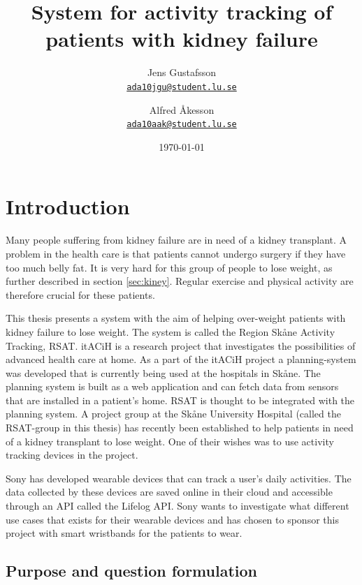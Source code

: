 \documentclass{cslthse-msc}
\author{
	Jens Gustafsson \\
	{\normalsize \href{mailto:ada10jgu@student.lu.se}{\texttt{ada10jgu@student.lu.se}}}
	\and
	Alfred Åkesson \\
    {\normalsize \href{mailto:ada10aak@student.lu.se}{\texttt{ada10aak@student.lu.se}}}
}
\title{System for activity tracking of patients with kidney failure}
\date{\today}
\begin{document}
\makefrontmatter


\chapter[Introduction]{Introduction}

Many people suffering from kidney failure are in need of a kidney transplant. A problem in the health care is that patients cannot undergo surgery if they have too much belly fat. It is very hard for this group of people to lose weight, as further described in section \ref{sec:kiney}. Regular exercise and physical activity are therefore crucial for these patients. 

This thesis presents a system with the aim of helping over-weight patients with kidney failure to lose weight. The system is called the Region Skåne Activity Tracking, RSAT. 
itACiH is a research project that investigates the possibilities of advanced health care at home. As a part of the itACiH project a planning-system was developed that is currently being used at the hospitals in Skåne. The planning system is built as a web application and can fetch data from sensors that are installed in a patient's home. RSAT is thought to be integrated with the planning system. 
A project group at the Skåne University Hospital (called the RSAT-group in this thesis) has recently been established to help patients in need of a kidney transplant to lose weight. One of their wishes was to use activity tracking devices in the project. 

Sony has developed wearable devices that can track a user’s daily activities. The data collected by these devices are saved online in their cloud and accessible through an API called the Lifelog API. Sony wants to investigate what different use cases that exists for their wearable devices and has chosen to sponsor this project with smart wristbands for the patients to wear.





\newpage

\section{Purpose and question formulation}
\end{document}
